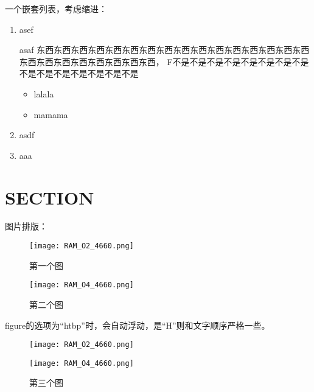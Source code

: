 \documentclass[UTF8,zihao=5]{ctexart} %
\begin{document}
一个嵌套列表，考虑缩进：
\begin{enumerate}[itemindent=2em] %
    \item asef \par asaf 东西东西东西东西东西东西东西东西东西东西东西东西东西东西东西东西东西东西东西东西东西东西东西东西，
          F不是不是不是不是不是不是不是不是不是不是不是不是不是不是不是
          \begin{itemize}[itemindent=2em]  %
              \item lalala
              \item mamama
          \end{itemize}
    \item asdf
    \item aaa
\end{enumerate}

\section{SECTION}

图片排版：

\begin{figure}[H]
    \begin{minipage}[c]{0.45\linewidth}  %
        \centering
        \texttt{[image: RAM\_O2\_4660.png]}  %
        \caption{第一个图}
        \label{fig:a}
    \end{minipage}
    \hfill %
    \begin{minipage}[c]{0.45\linewidth}  %
        \centering
        \texttt{[image: RAM\_O4\_4660.png]}  %
        \caption{第二个图}
        \label{fig:b}
    \end{minipage}
\end{figure}

figure的选项为“htbp”时，会自动浮动，是“H”则和文字顺序严格一些。

\begin{figure}[H]
    \begin{minipage}[c]{0.45\linewidth}  %
        \centering
        \texttt{[image: RAM\_O2\_4660.png]}  %
        \label{fig:x}
    \end{minipage}
    \hfill %
    \begin{minipage}[c]{0.45\linewidth}  %
        \centering
        \texttt{[image: RAM\_O4\_4660.png]}  %
        \label{fig:y}
    \end{minipage}
    \caption{第三个图}
\end{figure}
\end{document}

